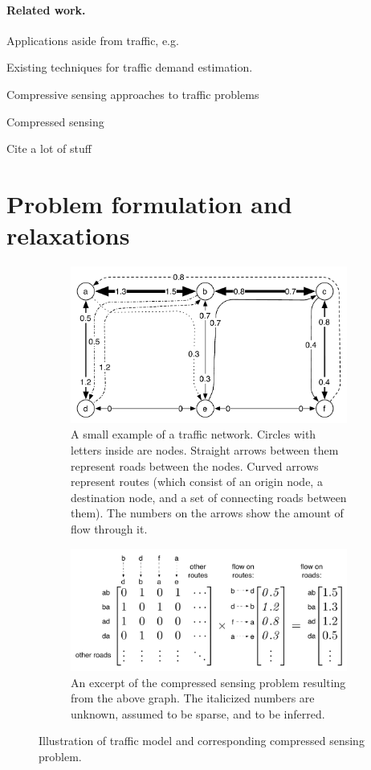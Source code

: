 \documentclass{article} %
\begin{document}
\paragraph{Related work.}
Applications aside from traffic, e.g.

Existing techniques for traffic demand estimation.

Compressive sensing approaches to traffic problems

Compressed sensing

Cite a lot of stuff

\section{Problem formulation and relaxations}
\begin{figure}[t]
  \centering
  \begin{subfigure}[h]{0.7\textwidth}
    \includegraphics[width=\textwidth]{figures/road-network-graph.pdf}
    \caption{A small example of a traffic network. Circles with letters inside
      are nodes. Straight arrows between them represent roads between the
      nodes. Curved arrows represent routes (which consist of an origin node, a
      destination node, and a set of connecting roads between them). The numbers
      on the arrows show the amount of flow through it.}
  \end{subfigure}
  \begin{subfigure}[h]{0.7\textwidth}
    \includegraphics[width=\textwidth]{figures/road-network-matrix.pdf}
    \caption{An excerpt of the compressed sensing problem resulting from the
      above graph. The italicized numbers are unknown, assumed to be sparse,
      and to be inferred.}
  \end{subfigure}
  \caption{Illustration of traffic model and corresponding compressed sensing problem.}
\end{figure}
\end{document}
